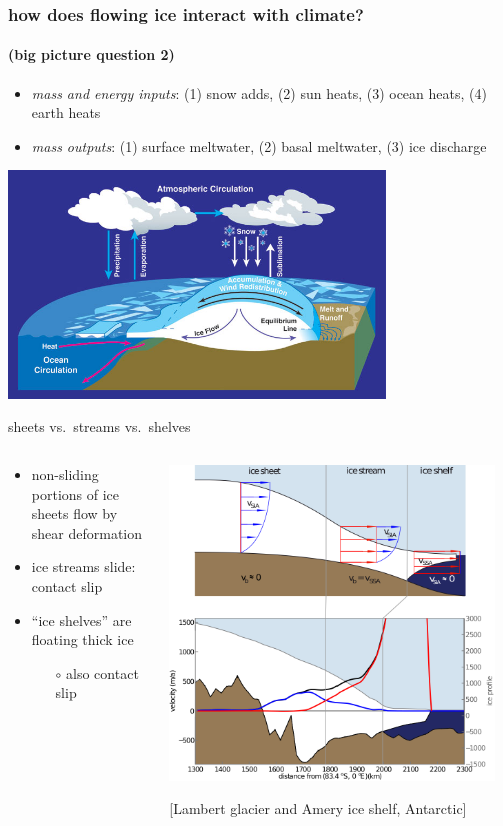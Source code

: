 \documentclass[10pt,hyperref={pdfpagelabels=true}]{beamer}
\newcommand{\contactslipslide}{
\begin{frame}{sheets vs.~streams vs.~shelves}

\begin{columns}
\begin{column}{0.35\textwidth}
\small
\begin{itemize}
\small
\item non-sliding portions of ice sheets flow by shear deformation
\item ice streams slide: \alert{contact slip}
\item ``ice shelves'' are floating thick ice
  \begin{itemize}
  \scriptsize
  \item[$\circ$] also \alert{contact slip}
  \end{itemize}
\end{itemize}
\end{column}

\begin{column}{0.65\textwidth}

\hfill\includegraphics[width=0.95\textwidth]{siassacartoon-lambert}

\begin{center}
\vspace{-0.18in}
\tiny [Lambert glacier and Amery ice shelf, Antarctic]
\end{center}
\end{column}
\end{columns}
\end{frame}
}
\begin{document}
\begin{frame}
  \frametitle{how does flowing ice interact with climate?}
  \framesubtitle{(big picture question 2)}

\medskip
\small
\begin{itemize}
\item \emph{mass and energy inputs}: (1) snow adds, (2) sun heats, (3) ocean heats, (4) earth heats
\item \emph{mass outputs}: (1) surface meltwater, (2) basal meltwater, (3) ice discharge
\end{itemize}

\begin{center}
  \includegraphics[width=0.75\textwidth]{mass-bal-atmos}
\end{center}
\end{frame}


\contactslipslide
\end{document}
